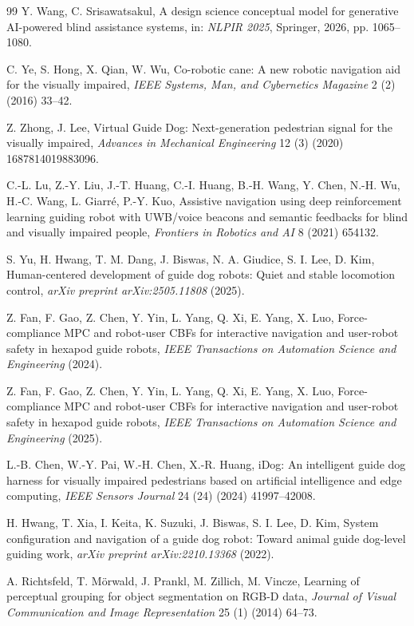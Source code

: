 \documentclass[11pt, a4paper]{article}
\begin{document}
{{{\begin{thebibliography}{99}
Y. Wang, C. Srisawatsakul, A design science conceptual model for generative AI-powered blind assistance systems, in: \textit{NLPIR 2025}, Springer, 2026, pp. 1065--1080.

C. Ye, S. Hong, X. Qian, W. Wu, Co-robotic cane: A new robotic navigation aid for the visually impaired, \textit{IEEE Systems, Man, and Cybernetics Magazine} 2 (2) (2016) 33--42.

Z. Zhong, J. Lee, Virtual Guide Dog: Next-generation pedestrian signal for the visually impaired, \textit{Advances in Mechanical Engineering} 12 (3) (2020) 1687814019883096.

C.-L. Lu, Z.-Y. Liu, J.-T. Huang, C.-I. Huang, B.-H. Wang, Y. Chen, N.-H. Wu, H.-C. Wang, L. Giarr\'e, P.-Y. Kuo, Assistive navigation using deep reinforcement learning guiding robot with UWB/voice beacons and semantic feedbacks for blind and visually impaired people, \textit{Frontiers in Robotics and AI} 8 (2021) 654132.

S. Yu, H. Hwang, T. M. Dang, J. Biswas, N. A. Giudice, S. I. Lee, D. Kim, Human-centered development of guide dog robots: Quiet and stable locomotion control, \textit{arXiv preprint arXiv:2505.11808} (2025).

Z. Fan, F. Gao, Z. Chen, Y. Yin, L. Yang, Q. Xi, E. Yang, X. Luo, Force-compliance MPC and robot-user CBFs for interactive navigation and user-robot safety in hexapod guide robots, \textit{IEEE Transactions on Automation Science and Engineering} (2024).

Z. Fan, F. Gao, Z. Chen, Y. Yin, L. Yang, Q. Xi, E. Yang, X. Luo, Force-compliance MPC and robot-user CBFs for interactive navigation and user-robot safety in hexapod guide robots, \textit{IEEE Transactions on Automation Science and Engineering} (2025).

L.-B. Chen, W.-Y. Pai, W.-H. Chen, X.-R. Huang, iDog: An intelligent guide dog harness for visually impaired pedestrians based on artificial intelligence and edge computing, \textit{IEEE Sensors Journal} 24 (24) (2024) 41997--42008.

H. Hwang, T. Xia, I. Keita, K. Suzuki, J. Biswas, S. I. Lee, D. Kim, System configuration and navigation of a guide dog robot: Toward animal guide dog-level guiding work, \textit{arXiv preprint arXiv:2210.13368} (2022).

A. Richtsfeld, T. M\"orwald, J. Prankl, M. Zillich, M. Vincze, Learning of perceptual grouping for object segmentation on RGB-D data, \textit{Journal of Visual Communication and Image Representation} 25 (1) (2014) 64--73.


\end{thebibliography}}}}
\end{document}
